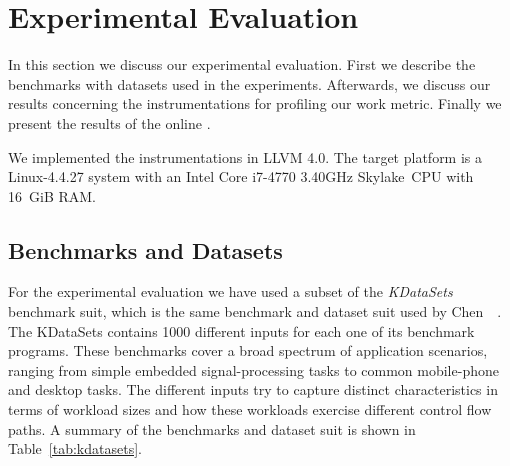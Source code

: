 
\chapter{Experimental Evaluation}

In this section we discuss our experimental evaluation.
First we describe the benchmarks with datasets used in the experiments.
Afterwards, we discuss our results concerning the instrumentations for profiling our work metric.
Finally we present the results of the online {\itercomp}.

We implemented the instrumentations in LLVM 4.0.
The target platform is a Linux-4.4.27 system with an Intel Core i7-4770 3.40GHz Skylake~CPU with 16~GiB RAM.

\section{Benchmarks and Datasets} \label{sec:benchmarks}


For the experimental evaluation we have used a subset of the \textit{KDataSets} benchmark suit, which is the same benchmark and dataset suit used by Chen~\etal~\cite{chen10,chen12a}.
The KDataSets contains 1000 different inputs for each one of its benchmark programs.
These benchmarks cover a broad spectrum of application scenarios, ranging from simple embedded signal-processing tasks to common mobile-phone and desktop tasks.
The different inputs try to capture distinct characteristics in terms of workload sizes and how these workloads exercise different control flow paths.
A summary of the benchmarks and dataset suit is shown in Table~\ref{tab:kdatasets}.

